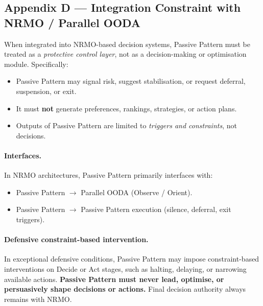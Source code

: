 \subsection*{Appendix D --- Integration Constraint with NRMO /
Parallel OODA}
\label{sec:pp-app-D}

When integrated into NRMO-based decision systems, Passive Pattern
must be treated as a \emph{protective control layer}, not as a
decision-making or optimisation module. Specifically:

\begin{itemize}
\item Passive Pattern may signal risk, suggest stabilisation, or
request deferral, suspension, or exit.
\item It must \textbf{not} generate preferences, rankings,
strategies, or action plans.
\item Outputs of Passive Pattern are limited to \emph{triggers and
constraints}, not decisions.
\end{itemize}

\paragraph{Interfaces.}
In NRMO architectures, Passive Pattern primarily interfaces with:

\begin{itemize}
\item Passive Pattern $\to$ Parallel OODA (Observe / Orient).
\item Passive Pattern $\to$ Passive Pattern execution
(silence, deferral, exit triggers).
\end{itemize}

\paragraph{Defensive constraint-based intervention.}
In exceptional defensive conditions, Passive Pattern may impose
constraint-based interventions on Decide or Act stages, such as
halting, delaying, or narrowing available actions. \textbf{Passive
Pattern must never lead, optimise, or persuasively shape decisions
or actions.} Final decision authority always remains with NRMO.
